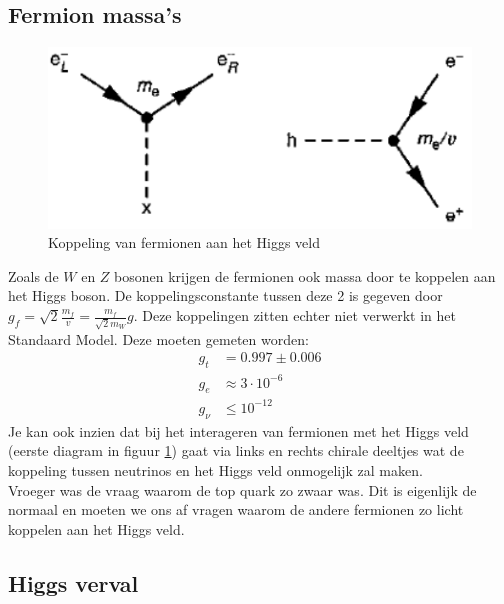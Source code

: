\documentclass[../main.tex]{subfiles}
\begin{document}
\subsection{Fermion massa's}%
\label{sub:fermion_massa_s}

\begin{figure}[h]
    \centering
    \includegraphics[width=0.6\linewidth]{higgs_boson/koppeling_higgs_e.png}
    \caption{Koppeling van fermionen aan het Higgs veld}%
    \label{fig:higgs_boson/koppeling_higgs_e}
\end{figure}

Zoals de $W$ en $Z$ bosonen krijgen de fermionen ook massa door te koppelen aan het Higgs boson. De koppelingsconstante tussen deze 2 is gegeven door $g_f = \sqrt{2} \frac{m_f}{v} = \frac{m_f}{\sqrt{2}m_W} g$. Deze koppelingen zitten echter niet verwerkt in het Standaard Model. Deze moeten gemeten worden:
\begin{equation}
    \begin{aligned}
        \label{eq:kc_h_fermionen}
        g_t &= 0.997 \pm 0.006\\
        g_e &\approx 3\cdot 10^{-6}\\
        g_\nu &\leq 10^{-12}
    \end{aligned}
\end{equation}
Je kan ook inzien dat bij het interageren van fermionen met het Higgs veld (eerste diagram in figuur \ref{fig:higgs_boson/koppeling_higgs_e}) gaat via links en rechts chirale deeltjes wat de koppeling tussen neutrinos en het Higgs veld onmogelijk zal maken.\\
Vroeger was de vraag waarom de top quark zo zwaar was. Dit is eigenlijk de normaal en moeten we ons af vragen waarom de andere fermionen zo licht koppelen aan het Higgs veld.

\subsection{Higgs verval}%
\label{sub:higgs_verval}
\end{document}

